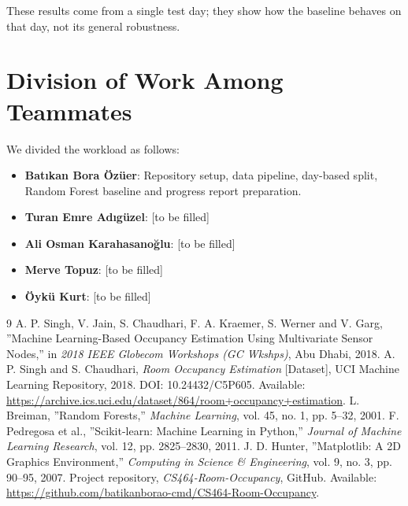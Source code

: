\documentclass[12pt,a4paper]{article}
\begin{document}
These results come from a single test day; they show how the baseline behaves on that day, not its general robustness.

\section{Division of Work Among Teammates}
We divided the workload as follows:

\begin{itemize}
  \item \textbf{Batıkan Bora Özüer}: Repository setup, data pipeline, day-based split, Random Forest baseline and progress report preparation.
  \item \textbf{Turan Emre Adıgüzel}: [to be filled]
  \item \textbf{Ali Osman Karahasanoğlu}: [to be filled]
  \item \textbf{Merve Topuz}: [to be filled]
  \item \textbf{Öykü Kurt}: [to be filled]
\end{itemize}

\begin{thebibliography}{9}
 A. P. Singh, V. Jain, S. Chaudhari, F. A. Kraemer, S. Werner and V. Garg, ''Machine Learning-Based Occupancy Estimation Using Multivariate Sensor Nodes,'' in \textit{2018 IEEE Globecom Workshops (GC Wkshps)}, Abu Dhabi, 2018.
 A. P. Singh and S. Chaudhari, \textit{Room Occupancy Estimation} [Dataset], UCI Machine Learning Repository, 2018. DOI: 10.24432/C5P605. Available: \url{https://archive.ics.uci.edu/dataset/864/room+occupancy+estimation}.
 L. Breiman, ''Random Forests,'' \textit{Machine Learning}, vol. 45, no. 1, pp. 5--32, 2001.
 F. Pedregosa et al., ''Scikit-learn: Machine Learning in Python,'' \textit{Journal of Machine Learning Research}, vol. 12, pp. 2825--2830, 2011.
 J. D. Hunter, ''Matplotlib: A 2D Graphics Environment,'' \textit{Computing in Science \& Engineering}, vol. 9, no. 3, pp. 90--95, 2007.
 Project repository, \textit{CS464-Room-Occupancy}, GitHub. Available: \url{https://github.com/batikanborao-cmd/CS464-Room-Occupancy}.
\end{thebibliography}
\end{document}
